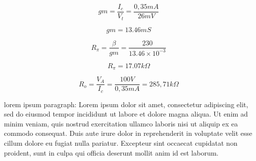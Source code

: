 $$gm = \frac{I_c}{V_t} = \frac{0,35 mA}{26 mV}$$

$$gm = 13.46 mS$$

$$R_\pi = \frac{\beta}{gm} = \frac{230}{13.46\times 10^{-3}}$$

$$ R_\pi = 17.07k \Omega$$

$$ R_o = \frac{V_A}{I_c} = \frac{100 V}{0,35 mA} = 285,71 k\Omega$$

lorem ipsum paragraph: Lorem ipsum dolor sit amet, consectetur adipiscing elit, sed do eiusmod tempor incididunt ut labore et dolore magna aliqua. Ut enim ad minim veniam, quis nostrud exercitation ullamco laboris nisi ut aliquip ex ea commodo consequat. Duis aute irure dolor in reprehenderit in voluptate velit esse cillum dolore eu fugiat nulla pariatur. Excepteur sint occaecat cupidatat non proident, sunt in culpa qui officia deserunt mollit anim id est laborum.